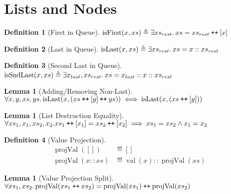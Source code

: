 \documentclass[a4paper, 10pt]{report}
\theoremstyle{definition}
\newtheorem{lemma}[theorem]{Lemma}
\newtheorem{definition}{Definition}[section]
\newcommand{\projval}{\operatorname{projVal}}
\newcommand{\isFirst}{\operatorname{isFirst}}
\newcommand{\isLast}{\operatorname{isLast}}
\newcommand{\isSndLast}{\operatorname{isSndLast}}
\newcommand{\nVal}[1]{\operatorname{val}(#1)}
\newcommand\catenate{\mathbin{\text{\ttfamily\upshape ++}}}
\begin{document}
\section{Lists and Nodes}
\label{appendix:common:section:ListsNodes}

\begin{definition}[First in Queue]\label{COMMON:Def:first-q}
  $\isFirst(x, xs) \eqdef \Exists xs_{rest} . xs = xs_{rest} \catenate [x]$
\end{definition}

\begin{definition}[Last in Queue]\label{COMMON:Def:last-q}
  $\isLast(x, xs) \eqdef \Exists xs_{rest} . xs = x :: xs_{rest}$
\end{definition}

\begin{definition}[Second Last in Queue]\label{COMMON:Def:sndlast-q}
  $\isSndLast(x, xs) \eqdef \Exists x_{last}, xs_{rest} . xs = x_{last} :: x :: xs_{rest}$
\end{definition}

\begin{lemma}[Adding/Removing Non-Last]\label{lemma:isLast-remove}
  $\All x, y, xs, ys.\\
  \isLast(x, (xs \catenate [y] \catenate ys)) \iff \isLast(x, (xs \catenate [y]))$
\end{lemma}

\begin{lemma}[List Destruction Equality]\label{lemma:list-last-eq}
  $\All xs_1, x_1, xs_2, x_2.\\
  xs_1 \catenate [x_1] = xs_2 \catenate [x_2] \implies xs_1 = xs_2 \land{} x_1 = x_2$
\end{lemma}

\begin{definition}[Value Projection]\label{COMMON:Def:val-proj}
  \begin{align*}
    \projval([]) &\eqdef []\\
    \projval(x :: xs) &\eqdef \nVal{x} :: \projval(xs)
  \end{align*}
\end{definition}

\begin{lemma}[Value Projection Split]\label{lemma:value-proj-split}
  $\All xs_1, xs_2.\\
  \projval(xs_1 \catenate xs_2) = \projval(xs_1) \catenate \projval(xs_2)$
\end{lemma}
\end{document}
